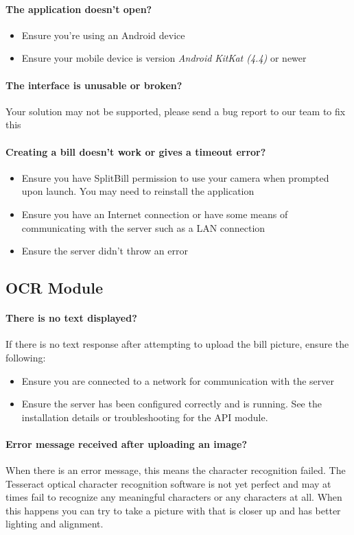 \documentclass[12pt,a4paper]{article}
\begin{document}
\paragraph{The application doesn't open?}
\begin{itemize}
\item Ensure you're using an Android device 
\item Ensure your mobile device is version \emph{Android KitKat (4.4)} or newer
\end{itemize}

\paragraph{The interface is unusable or broken?}
Your solution may not be supported, please send a bug report to our team to fix this 
\paragraph{Creating a bill doesn't work or gives a timeout error?}
\begin{itemize}
\item Ensure you have SplitBill permission to use your camera when prompted upon launch. You may need to reinstall the application
\item Ensure you have an Internet connection or have some means of communicating with the server such as a LAN connection
\item Ensure the server didn't throw an error
\end{itemize}
    
    \subsection{OCR Module} 
     \paragraph{There is no text displayed?}
     If there is no text response after attempting to upload the bill picture, ensure the following: 
    \begin{itemize}
    \item Ensure you are connected to a network for communication with the server
    \item Ensure the server has been configured correctly and is running. See the installation details or troubleshooting for the API module.
    \end{itemize}
    \paragraph{Error message received after uploading an image?}
    When there is an error message, this means the character recognition failed. The Tesseract optical character recognition software is not yet perfect and may at times fail to recognize any meaningful characters or any characters at all. When this happens you can try to take a picture with that is closer up and has better lighting and alignment. 
\end{document}
